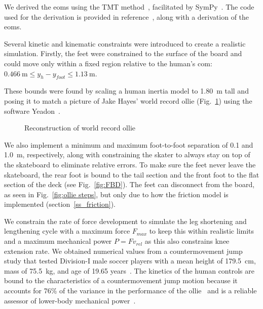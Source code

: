 \documentclass[default,iicol,pdflatex]{sn-jnl}
\begin{document}
We derived the \glspl{eom} using the TMT method~\cite{vallery_heike_advanced_2018}, facilitated by SymPy~\cite{meurer_sympy_2017}.
The code used for the derivation is provided in reference~\cite{heinen_optimal_2022}, along with a derivation of the \glspl{eom}.

Several kinetic and kinematic constraints were introduced to create a realistic simulation. Firstly, the feet were constrained to the surface of the board and could move only within a fixed region relative to the human’s \gls{com}: $\SI{0.466}{\meter} \leq y_h - y_{foot} \leq \SI{1.13}{\meter}$.

These bounds were found by scaling a human inertia model to \SI{1.80}{\meter} tall and posing it to match a picture of Jake Hayes' world record ollie  (Fig.~\ref{fig:f_record}) using the software Yeadon~\cite{Dembia2015}. 

\begin{figure}
    \centering
    \quad
    \caption{Reconstruction of world record ollie} 
    \label{fig:f_record}
\end{figure}

We also implement a minimum and maximum foot-to-foot separation of 0.1 and \SI{1.0}{\meter}, respectively, along with constraining the skater to always stay on top of the skateboard to eliminate relative errors.
To make sure the feet never leave the skateboard, the rear foot is bound to the tail section and the front foot to the flat section of the deck (see Fig.~\ref{fig:FBD}).
The feet can disconnect from the board, as seen in Fig.~\ref{fig:ollie steps}, but only due to how the friction model is implemented (section~\ref{ss_friction}).

We constrain the rate of force development to simulate the leg shortening and lengthening cycle with a maximum force $F_{max}$ to keep this within realistic limits and a maximum mechanical power $P = F v_{rel}$ as this also constrains knee extension rate. We obtained numerical values from a countermovement jump study that tested Division-I male soccer players with a mean height of \SI{179.5}{\centi\meter}, mass of \SI{75.5}{\kilo\gram}, and age of 19.65 years~\cite{barker_relationships_2018}. The kinetics of the human controls are bound to the characteristics of a countermovement jump motion because it accounts for 76\% of the variance in the performance of the ollie~\cite{candotti_lower_2012} and is a reliable assessor of lower-body mechanical power~\cite{barker_relationships_2018}. 
\end{document}
